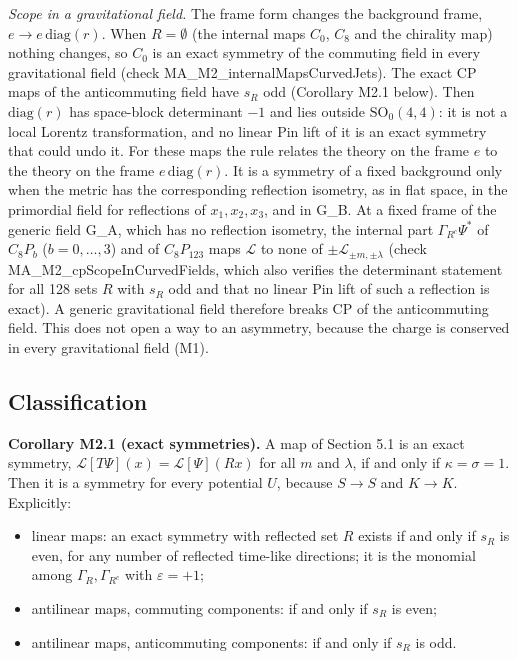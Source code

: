 \documentclass[11pt]{article}
\begin{document}
\emph{Scope in a gravitational field.} The frame form changes the background frame, $e\to e\,\mathrm{diag}(r)$. When $R=\emptyset$ (the internal maps $C_0$, $C_8$ and the chirality map) nothing changes, so $C_0$ is an exact symmetry of the commuting field in every gravitational field (check MA\_M2\_internalMapsCurvedJets). The exact CP maps of the anticommuting field have $s_R$ odd (Corollary M2.1 below). Then $\mathrm{diag}(r)$ has space-block determinant $-1$ and lies outside $\mathrm{SO}_0(4,4)$: it is not a local Lorentz transformation, and no linear Pin lift of it is an exact symmetry that could undo it. For these maps the rule relates the theory on the frame $e$ to the theory on the frame $e\,\mathrm{diag}(r)$. It is a symmetry of a fixed background only when the metric has the corresponding reflection isometry, as in flat space, in the primordial field for reflections of $x_1,x_2,x_3$, and in G\_B. At a fixed frame of the generic field G\_A, which has no reflection isometry, the internal part $\Gamma_{R^c}\Psi^\ast$ of $C_8P_b$ ($b=0,\dots,3$) and of $C_8P_{123}$ maps $\mathcal L$ to none of $\pm\mathcal L_{\pm m,\pm\lambda}$ (check MA\_M2\_cpScopeInCurvedFields, which also verifies the determinant statement for all 128 sets $R$ with $s_R$ odd and that no linear Pin lift of such a reflection is exact). A generic gravitational field therefore breaks CP of the anticommuting field. This does not open a way to an asymmetry, because the charge is conserved in every gravitational field (M1).

\subsection{Classification}

\textbf{Corollary M2.1 (exact symmetries).} A map of Section 5.1 is an exact symmetry, $\mathcal L[T\Psi](x)=\mathcal L[\Psi](Rx)$ for all $m$ and $\lambda$, if and only if $\kappa=\sigma=1$. Then it is a symmetry for every potential $U$, because $S\to S$ and $K\to K$. Explicitly:

\begin{itemize}
\item linear maps: an exact symmetry with reflected set $R$ exists if and only if $s_R$ is even, for any number of reflected time-like directions; it is the monomial among $\Gamma_R,\Gamma_{R^c}$ with $\varepsilon=+1$;
\item antilinear maps, commuting components: if and only if $s_R$ is even;
\item antilinear maps, anticommuting components: if and only if $s_R$ is odd.
\end{itemize}
\end{document}
